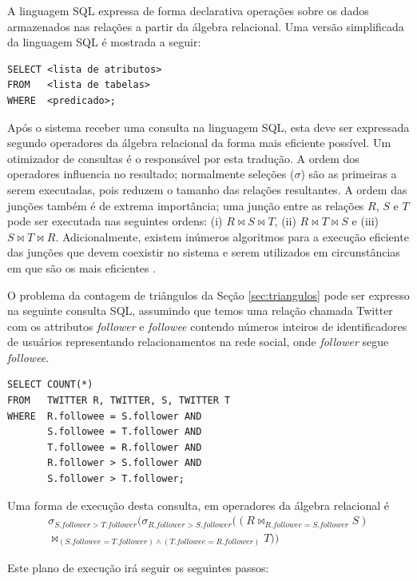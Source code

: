 A linguagem SQL expressa de forma declarativa operações sobre os dados
armazenados nas relações a partir da álgebra relacional. Uma versão simplificada
da linguagem SQL é mostrada a seguir:

\begin{lstlisting}[style=MySQLStyle]
SELECT <lista de atributos>
FROM   <lista de tabelas>
WHERE  <predicado>;
\end{lstlisting}

Após o sistema receber uma consulta na linguagem SQL, esta deve ser expressada
segundo operadores da álgebra relacional da forma mais eficiente possível. Um 
otimizador de consultas é o responsável por esta tradução. A ordem dos operadores
influencia no resultado; normalmente seleções ($\sigma$) são as primeiras a serem
executadas, pois reduzem o tamanho das relações resultantes. A ordem das junções
também é de extrema importância; uma junção entre as relações $R$, $S$ e $T$ pode
ser executada nas seguintes ordens: (i) $R \bowtie S \bowtie T$, (ii) 
$R \bowtie T \bowtie S$ e (iii) $S \bowtie T \bowtie R$. Adicionalmente, existem
inúmeros algoritmos para a execução eficiente das junções que devem coexistir no
sistema e serem utilizados em circunstâncias em que são os mais eficientes 
\citep{Mishra1992}.

O problema da contagem de triângulos da Seção \ref{sec:triangulos} pode ser expresso na 
seguinte consulta SQL, assumindo que temos uma relação chamada Twitter com os attributos
\emph{follower} e \emph{followee} contendo números inteiros de identificadores de usuários
representando relacionamentos na rede social, onde \emph{follower} segue \emph{followee}.

\begin{lstlisting}[style=MySQLStyle]
SELECT COUNT(*) 
FROM   TWITTER R, TWITTER, S, TWITTER T
WHERE  R.followee = S.follower AND
       S.followee = T.follower AND
       T.followee = R.follower AND
       R.follower > S.follower AND
       S.follower > T.follower;
\end{lstlisting}

Uma forma de execução desta consulta, em operadores da álgebra relacional é 
\begin{multline}
\sigma_{S.follower > T.follower}(\sigma_{R.follower > S.follower}(( R \bowtie_{R.followee = S.follower} S ) \\
\bowtie_{(S.followee = T.follower) \land (T.followee = R.follower)} T))
\end{multline}

Este plano de execução irá seguir os seguintes passos:

